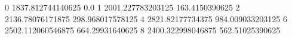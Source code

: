 0 1837.812744140625 0.0
1 2001.227783203125 163.4150390625
2 2136.78076171875 298.968017578125
4 2821.82177734375 984.009033203125
6 2502.112060546875 664.29931640625
8 2400.322998046875 562.51025390625
